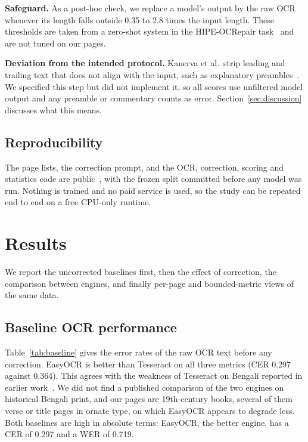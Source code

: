 \documentclass[conference]{IEEEtran}
\begin{document}
\textbf{Safeguard.} As a post-hoc check, we replace a model's output by the raw OCR whenever its length falls outside 0.35 to 2.8 times the input length. These thresholds are taken from a zero-shot system in the HIPE-OCRepair task~\cite{ehrmann2026hipeocrepair} and are not tuned on our pages.

\textbf{Deviation from the intended protocol.} Kanerva et al.\ strip leading and trailing text that does not align with the input, such as explanatory preambles~\cite{kanerva2025nofreelunches}. We specified this step but did not implement it, so all scores use unfiltered model output and any preamble or commentary counts as error. Section~\ref{sec:discussion} discusses what this means.

\subsection{Reproducibility}
The page lists, the correction prompt, and the OCR, correction, scoring and statistics code are public~\cite{rahman2026repo}, with the frozen split committed before any model was run. Nothing is trained and no paid service is used, so the study can be repeated end to end on a free CPU-only runtime.

\section{Results}

We report the uncorrected baselines first, then the effect of correction, the comparison between engines, and finally per-page and bounded-metric views of the same data.

\subsection{Baseline OCR performance}
Table~\ref{tab:baseline} gives the error rates of the raw OCR text before any correction. EasyOCR is better than Tesseract on all three metrics (CER 0.297 against 0.364). This agrees with the weakness of Tesseract on Bengali reported in earlier work~\cite{zulkarnain2023bbocr,rabby2024enhancement}. We did not find a published comparison of the two engines on historical Bengali print, and our pages are 19th-century books, several of them verse or title pages in ornate type, on which EasyOCR appears to degrade less. Both baselines are high in absolute terms: EasyOCR, the better engine, has a CER of 0.297 and a WER of 0.719.
\end{document}
